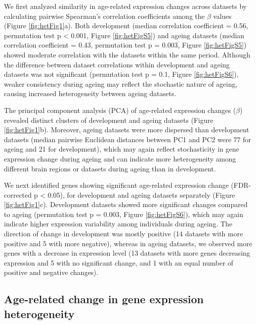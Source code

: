 \documentclass[12pt,twoside]{unicam}
\begin{document}
We first analyzed similarity in age-related expression changes across datasets by calculating pairwise Spearman's correlation coefficients among the \(\beta\) values (Figure \ref{fig:hetFig1}a). Both development (median correlation coefficient = 0.56, permutation test p \textless{} 0.001, Figure \ref{fig:hetFigS5}) and ageing datasets (median correlation coefficient = 0.43, permutation test p = 0.003, Figure \ref{fig:hetFigS5}) showed moderate correlation with the datasets within the same period. Although the difference between dataset correlations within development and ageing datasets was not significant (permutation test p = 0.1, Figure \ref{fig:hetFigS6}), weaker consistency during ageing may reflect the stochastic nature of ageing, causing increased heterogeneity between ageing datasets.

The principal component analysis (PCA) of age-related expression changes (\(\beta\)) revealed distinct clusters of development and ageing datasets (Figure \ref{fig:hetFig1}b). Moreover, ageing datasets were more dispersed than development datasets (median pairwise Euclidean distances between PC1 and PC2 were 77 for ageing and 21 for development), which may again reflect stochasticity in gene expression change during ageing and can indicate more heterogeneity among different brain regions or datasets during ageing than in development.

We next identified genes showing significant age-related expression change (FDR-corrected p \textless{} 0.05), for development and ageing datasets separately (Figure \ref{fig:hetFig1}c). Development datasets showed more significant changes compared to ageing (permutation test p = 0.003, Figure \ref{fig:hetFigS6}), which may again indicate higher expression variability among individuals during ageing. The direction of change in development was mostly positive (14 datasets with more positive and 5 with more negative), whereas in ageing datasets, we observed more genes with a decrease in expression level (13 datasets with more genes decreasing expression and 5 with no significant change, and 1 with an equal number of positive and negative changes).

\hypertarget{age-related-change-in-gene-expression-heterogeneity}{%
\subsection{Age-related change in gene expression heterogeneity}\label{age-related-change-in-gene-expression-heterogeneity}}
\end{document}
